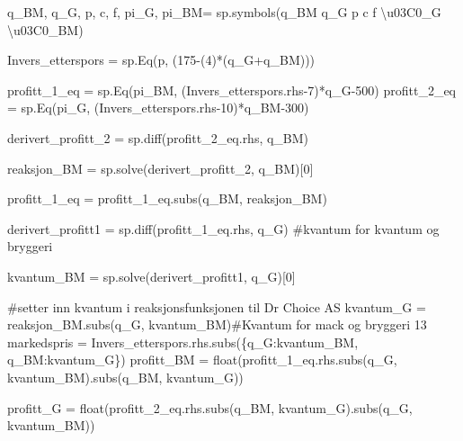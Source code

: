 \documentclass[
  12pt,
  a4paper,
  DIV=11,
  numbers=noendperiod]{scrartcl}
\newenvironment{Shaded}{\begin{snugshade}}{\end{snugshade}}
\newcommand{\BuiltInTok}[1]{\textcolor[rgb]{0.00,0.23,0.31}{#1}}
\newcommand{\CharTok}[1]{\textcolor[rgb]{0.13,0.47,0.30}{#1}}
\newcommand{\CommentTok}[1]{\textcolor[rgb]{0.37,0.37,0.37}{#1}}
\newcommand{\DecValTok}[1]{\textcolor[rgb]{0.68,0.00,0.00}{#1}}
\newcommand{\NormalTok}[1]{\textcolor[rgb]{0.00,0.23,0.31}{#1}}
\newcommand{\OperatorTok}[1]{\textcolor[rgb]{0.37,0.37,0.37}{#1}}
\newcommand{\StringTok}[1]{\textcolor[rgb]{0.13,0.47,0.30}{#1}}
\begin{document}
\begin{Shaded}
\begin{Highlighting}[]
\NormalTok{q\_BM, q\_G, p, c, f, pi\_G, pi\_BM}\OperatorTok{=}\NormalTok{ sp.symbols(}\StringTok{\textquotesingle{}q\_BM q\_G p c f }\CharTok{\textbackslash{}u03C0}\StringTok{\_G }\CharTok{\textbackslash{}u03C0}\StringTok{\_BM\textquotesingle{}}\NormalTok{)}

\NormalTok{Invers\_etterspors }\OperatorTok{=}\NormalTok{ sp.Eq(p, (}\DecValTok{175}\OperatorTok{{-}}\NormalTok{(}\DecValTok{4}\NormalTok{)}\OperatorTok{*}\NormalTok{(q\_G}\OperatorTok{+}\NormalTok{q\_BM)))}


\NormalTok{profitt\_1\_eq }\OperatorTok{=}\NormalTok{ sp.Eq(pi\_BM, (Invers\_etterspors.rhs}\OperatorTok{{-}}\DecValTok{7}\NormalTok{)}\OperatorTok{*}\NormalTok{q\_G}\OperatorTok{{-}}\DecValTok{500}\NormalTok{)}
\NormalTok{profitt\_2\_eq }\OperatorTok{=}\NormalTok{ sp.Eq(pi\_G, (Invers\_etterspors.rhs}\OperatorTok{{-}}\DecValTok{10}\NormalTok{)}\OperatorTok{*}\NormalTok{q\_BM}\OperatorTok{{-}}\DecValTok{300}\NormalTok{)}


\NormalTok{derivert\_profitt\_2 }\OperatorTok{=}\NormalTok{ sp.diff(profitt\_2\_eq.rhs, q\_BM)}

\NormalTok{reaksjon\_BM }\OperatorTok{=}\NormalTok{ sp.solve(derivert\_profitt\_2, q\_BM)[}\DecValTok{0}\NormalTok{]}

\NormalTok{profitt\_1\_eq }\OperatorTok{=}\NormalTok{ profitt\_1\_eq.subs(q\_BM, reaksjon\_BM)}

\NormalTok{derivert\_profitt1 }\OperatorTok{=}\NormalTok{ sp.diff(profitt\_1\_eq.rhs, q\_G) }\CommentTok{\#kvantum for kvantum og bryggeri}

\NormalTok{kvantum\_BM }\OperatorTok{=}\NormalTok{ sp.solve(derivert\_profitt1, q\_G)[}\DecValTok{0}\NormalTok{]}

\CommentTok{\#setter inn kvantum i reaksjonsfunksjonen til Dr Choice AS}
\NormalTok{kvantum\_G }\OperatorTok{=}\NormalTok{ reaksjon\_BM.subs(q\_G, kvantum\_BM)}\CommentTok{\#Kvantum for mack og bryggeri 13}
\NormalTok{markedspris }\OperatorTok{=}\NormalTok{ Invers\_etterspors.rhs.subs(\{q\_G:kvantum\_BM, q\_BM:kvantum\_G\})}
\NormalTok{profitt\_BM }\OperatorTok{=} \BuiltInTok{float}\NormalTok{(profitt\_1\_eq.rhs.subs(q\_G, kvantum\_BM).subs(q\_BM, kvantum\_G))}

\NormalTok{profitt\_G }\OperatorTok{=} \BuiltInTok{float}\NormalTok{(profitt\_2\_eq.rhs.subs(q\_BM, kvantum\_G).subs(q\_G, kvantum\_BM))}


\end{Highlighting}
\end{Shaded}
\end{document}
